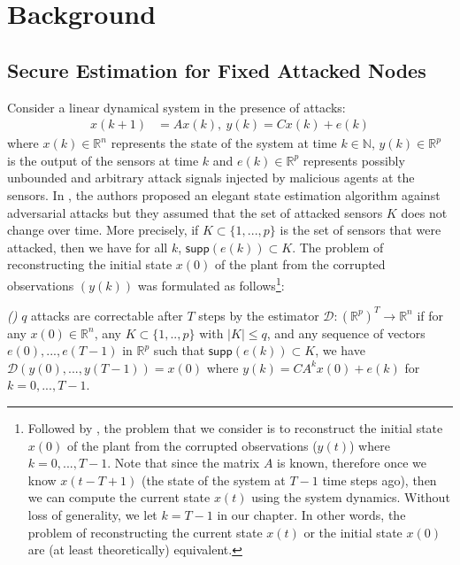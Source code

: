 \documentclass[../../thesis.tex]{subfiles}
\begin{document}

\section{Background}\label{sec:overview} 

\subsection{Secure Estimation for Fixed Attacked Nodes \cite{Fawzi:2014} }

Consider a linear dynamical system in the presence of attacks:
\begin{eqnarray}
		x(k+1) &= A x(k), ~y(k) = C x (k) + e(k)
		\label{eq:system_model}
\end{eqnarray}
where $x(k)\in \mathbb{R}^n$ represents the state of the system at time $k\in \mathbb{N}$, $y(k) \in \mathbb{R}^p$ is the output of the sensors at time $k$ and $e(k) \in \mathbb{R}^p $ represents possibly unbounded and arbitrary attack signals injected by malicious agents at the sensors. In \cite{Fawzi:2014}, the authors proposed an elegant state estimation algorithm against adversarial attacks but they assumed that the set of attacked sensors $K$ does not change over time. More precisely, if $K \subset \{1, ..., p\}$ is the set of sensors that were attacked, then we have for all $k$, $\textsf{supp}(e(k))\subset K$. The problem of reconstructing the initial state $x(0)$ of the plant from the corrupted observations $( y(k))$ was formulated as follows\footnote{Followed by \cite{Fawzi:2014}, the problem that we consider is to reconstruct the initial state $x(0)$ of the plant from the corrupted observations ($y(t)$) where $k=0,...,T-1$. Note that since the matrix $A$ is known, therefore once we know $x(t-T+1)$ (the state of the system at $T-1$ time steps ago), then we can compute the current state $x(t)$ using the system dynamics. Without loss of generality, we let $k=T-1$ in our chapter. In other words, the problem of reconstructing the current state $x(t)$ or the initial state $x(0)$ are (at least theoretically) equivalent.}:

\begin{definition} \emph{(\hspace{1sp}\cite{Fawzi:2014})} 
$q$ attacks are correctable after $T$ steps by the estimator $\mathcal{D}: {(\mathbb{R} ^p) } ^T  \rightarrow \mathbb{R}^n$ if for any $x(0) \in \mathbb{R}^n$, any $K \subset \{1,.., p\} $ with $\lvert K \rvert \le q$, and any sequence of vectors $e(0),...,e(T-1)$ in $\mathbb{R}^p$ such that $\textsf{supp}(e(k)) \subset K$, we have $\mathcal{D} (y(0),...,y(T-1)) = x(0)$ where $y(k) = CA^k x(0) + e(k)$ for $k=0,...,T-1$.
\end{definition}
\end{document}

